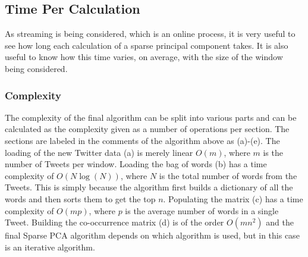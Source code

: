 \documentclass[11pt,a4paper]{article}
\begin{document}

\subsection{Time Per Calculation}
As streaming is being considered, which is an online process, it is very useful to see how long each calculation of a sparse principal component takes. It is also useful to know how this time varies, on average, with the size of the window being considered.
\subsubsection{Complexity}
The complexity of the final algorithm can be split into various parts and can be calculated as the complexity given as a number of operations per section. The sections are labeled in the comments of the algorithm above as (a)-(e). The loading of the new Twitter data (a) is merely linear $O(m)$, where $m$ is the number of Tweets per window. Loading the bag of words (b) has a time complexity of $O(N\log(N))$, where $N$ is the total number of words from the Tweets. This is simply because the algorithm first builds a dictionary of all the words and then sorts them to get the top $n$. Populating the matrix (c) has a time complexity of $O(mp)$, where $p$ is the average number of words in a single Tweet. Building the co-occurrence matrix (d) is of the order $O(mn^2)$ and the final Sparse PCA algorithm depends on which algorithm is used, but in this case is an iterative algorithm. 
\end{document}
